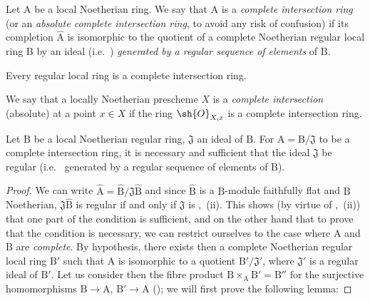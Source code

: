 
\begin{definition}[19.3.1]
\label{IV.19.3.1}
Let $\mathrm{A}$ be a local Noetherian ring.
We say that $\mathrm{A}$ is a \emph{complete intersection ring} (or an \emph{absolute complete intersection ring}, to avoid any risk of confusion) if its completion $\widehat{\mathrm{A}}$ is isomorphic to the quotient of a complete Noetherian regular local ring $\mathrm{B}$ by an ideal (i.e.\ ) \emph{generated by a regular sequence of elements} of $\mathrm{B}$.

Every regular local ring is a complete intersection ring.

We say that a locally Noetherian prescheme $X$ is a \emph{complete intersection} (absolute) at a point $x\in X$ if the ring $\sh{O}_{X,x}$ is a complete intersection ring.
\end{definition}

\begin{proposition}[19.3.2]
\label{IV.19.3.2}
Let $\mathrm{B}$ be a local Noetherian regular ring, $\mathfrak{J}$ an ideal of $\mathrm{B}$.
For $\mathrm{A}=\mathrm{B}/\mathfrak{J}$ to be a complete intersection ring, it is necessary and sufficient that the ideal $\mathfrak{J}$ be regular (i.e.\  generated by a regular sequence of elements of $\mathrm{B}$).
\end{proposition}

\begin{proof}
We can write $\widehat{\mathrm{A}}=\widehat{\mathrm{B}}/\mathfrak{J}\widehat{\mathrm{B}}$ and since $\widehat{\mathrm{B}}$ is a $\mathrm{B}$-module faithfully flat and $\mathrm{B}$ Noetherian, $\mathfrak{J}\widehat{\mathrm{B}}$ is regular if and only if $\mathfrak{J}$ is ,~(ii).
This shows (by virtue of ,~(ii)) that one part of the condition is sufficient, and on the other hand that to prove that the condition is necessary, we can restrict ourselves to the case where $\mathrm{A}$ and $\mathrm{B}$ are \emph{complete}.
By hypothesis, there exists then a complete Noetherian regular local ring $\mathrm{B}'$ such that $\mathrm{A}$ is isomorphic to a quotient $\mathrm{B}'/\mathfrak{J}'$, where $\mathfrak{J}'$ is a regular ideal of $\mathrm{B}'$.
Let us consider then the fibre product $\mathrm{B}\times_{\mathrm{A}}\mathrm{B}'=\mathrm{B}''$ for the surjective homomorphisms $\mathrm{B}\to\mathrm{A}$, $\mathrm{B}'\to\mathrm{A}$ (); we will first prove the following lemma:
\end{proof}

